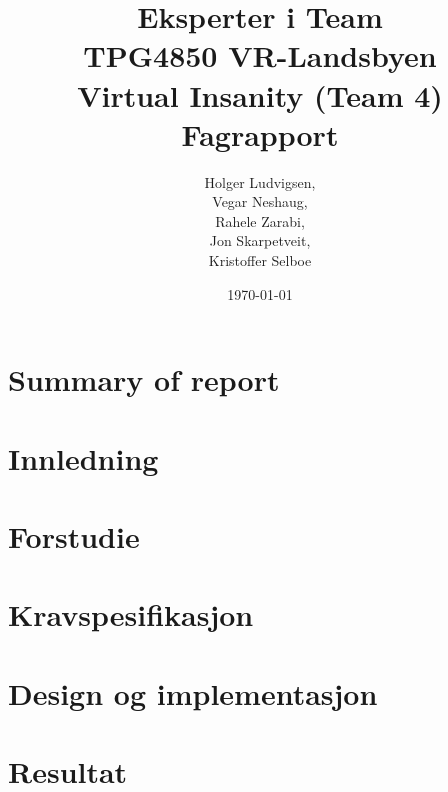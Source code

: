 \documentclass[12pt]{report}
\title{{\Large Eksperter i Team\\TPG4850 VR-Landsbyen\\{\bf Virtual Insanity (Team 4)\\Fagrapport}}}
\author{Holger Ludvigsen,\\Vegar Neshaug,\\Rahele Zarabi,\\Jon Skarpetveit,\\Kristoffer Selboe}
\date{{\small \today}}
\begin{document}
\maketitle

\chapter{Summary of report}
	
\pagebreak
	
\setlength{\parskip}{0.0in}
\tableofcontents
\setlength{\parskip}{0.1in}

\chapter{Innledning}

	

\chapter{Forstudie}

	

\chapter{Kravspesifikasjon}

	
	
\chapter{Design og implementasjon}

	

\chapter{Resultat}

	




%	

	

\end{document}
